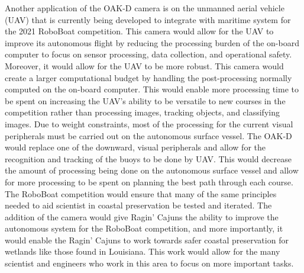 \documentclass[letterpaper, 12 pt, conference]{ieeeconf}
\begin{document}
Another application of the OAK-D camera is on the unmanned aerial vehicle (UAV) that is currently being developed to integrate with maritime system for the 2021 RoboBoat competition. This camera would allow for the UAV to improve its autonomous flight by reducing the processing burden of the on-board computer to focus on sensor processing, data collection, and operational safety. Moreover, it would allow for the UAV to be more robust. This camera would create a larger computational budget by handling the post-processing normally computed on the on-board computer. This would enable more processing time to be spent on increasing the UAV’s ability to be versatile to new courses in the competition rather  than processing images, tracking objects, and classifying images. Due to weight constraints, most of the processing for the current visual peripherals must be carried out on the autonomous surface vessel. The OAK-D would replace one of the downward, visual peripherals and allow for the recognition and tracking of the buoys to be done by UAV. This would decrease the amount of processing being done on the autonomous surface vessel and allow for more processing to be spent on planning the best path through each course.
The RoboBoat competition would ensure that many of the same principles needed to aid scientist in coastal preservation be tested and iterated. The addition of the camera would give Ragin’ Cajuns the ability to improve the autonomous system for the RoboBoat competition, and more importantly, it would enable the Ragin’ Cajuns to work towards safer coastal preservation for wetlands like those found in Louisiana. This work would allow for the many scientist and engineers who work in this area to focus on more important tasks. 
\end{document}
